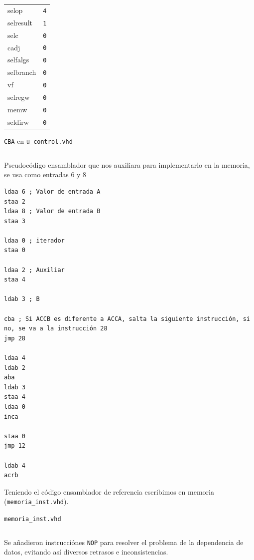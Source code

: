 \documentclass{IEEEtran}
\newenvironment{code}{\captionsetup{type=listing}}{}
\begin{document}
\begin{itemize}
\begin{table}[htbp]
\begin{tabular}{ll}
selop & \texttt{4}\\
selresult & \texttt{1}\\
selc & \texttt{0}\\
cadj & \texttt{0}\\
selfalgs & \texttt{0}\\
selbranch & \texttt{0}\\
vf & \texttt{0}\\
selregw & \texttt{0}\\
memw & \texttt{0}\\
seldirw & \texttt{0}\\
\hline
\end{tabular}
\end{table}
\begin{code}
\caption{\texttt{CBA} en \texttt{u\_control.vhd}}
\inputminted[firstline=253, lastline=271]{vhdl}{../Risc/u_control.vhd}
\end{code}
\end{itemize}

\begin{code}
\caption{Pseudocódigo ensamblador que nos auxiliara para implementarlo en la memoria, se usa como entradas 6 y 8}
\begin{verbatim}
ldaa 6 ; Valor de entrada A
staa 2
ldaa 8 ; Valor de entrada B
staa 3

ldaa 0 ; iterador
staa 0

ldaa 2 ; Auxiliar
staa 4

ldab 3 ; B

cba ; Si ACCB es diferente a ACCA, salta la siguiente instrucción, si no, se va a la instrucción 28
jmp 28

ldaa 4
ldab 2
aba
ldab 3
staa 4
ldaa 0
inca

staa 0
jmp 12

ldab 4
acrb
\end{verbatim}
\end{code}

Teniendo el código ensamblador de referencia escribimos en memoria (\texttt{memoria\_inst.vhd}).
\begin{code}
\caption{\texttt{memoria\_inst.vhd}}
\inputminted{vhdl}{../Risc/memoria_inst.vhd}
\end{code}

Se añadieron instrucciónes \texttt{NOP} para resolver el problema de la dependencia de datos, evitando así diversos retrasos e inconsistencias.
\end{document}
